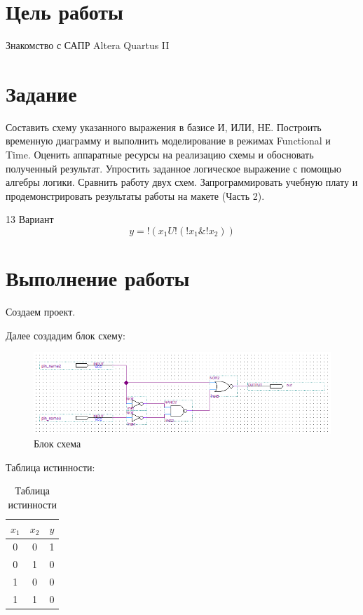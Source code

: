 \documentclass[a4paper,14pt]{article}
\begin{document}

\tableofcontents
\pagebreak

\section{Цель работы}

Знакомство с САПР Altera Quartus II

\section{Задание}

Составить схему указанного выражения в базисе И, ИЛИ, НЕ.
Построить временную диаграмму и выполнить моделирование в режимах
Functional и Time. Оценить аппаратные ресурсы на реализацию схемы и
обосновать полученный результат. Упростить заданное логическое
выражение с помощью алгебры логики. Сравнить работу двух схем.
Запрограммировать учебную плату и продемонстрировать результаты
работы на макете (Часть 2).

13 Вариант
$$y =  !(x_1 U !(!x_1 \& !x_2))$$

\section{Выполнение работы}

Создаем проект.

Далее создадим блок схему:

\begin{figure}[H]
	\centering
	\includegraphics[width=0.7\linewidth]{image/01_01}
	\caption{Блок схема}
	\label{fig:0101}
\end{figure}

Таблица истинности:

\begin{table}[H]
	\caption{Таблица истинности}
	\centering
	\begin{tabular}{|c|c|c|}
		\hline
		$x_1$ & $x_2$ & $y$ \\ \hline
		0    & 0    & 1 \\ \hline
		0    & 1    & 0 \\ \hline
		1    & 0    & 0 \\ \hline
		1    & 1    & 0 \\ \hline
	\end{tabular}
\end{table}
\end{document}
